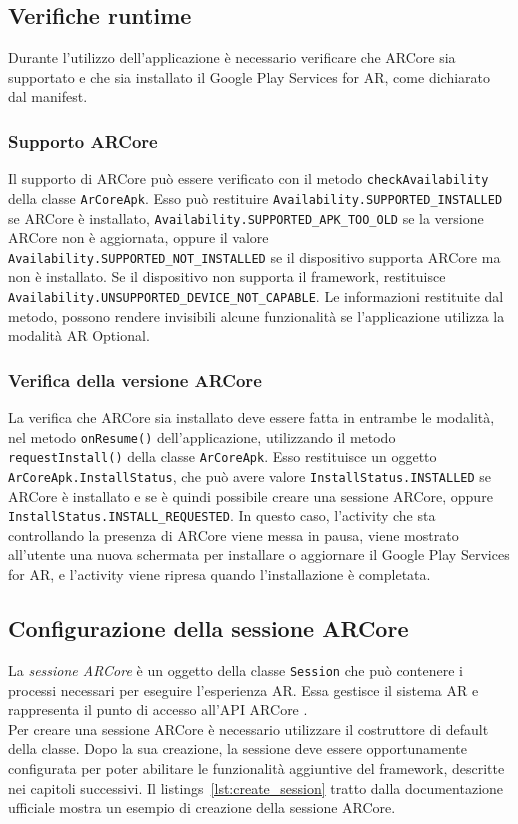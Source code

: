 \documentclass[crop=false, class=book]{standalone}
\begin{document}
	\subsection{Verifiche runtime}
	Durante l'utilizzo dell'applicazione è necessario verificare che ARCore sia supportato e che sia installato il Google Play Services for AR, come dichiarato dal manifest.
	
	\subsubsection{Supporto ARCore}
	Il supporto di ARCore può essere verificato con il metodo \verb|checkAvailability| della classe \verb|ArCoreApk|. Esso può restituire \verb|Availability.SUPPORTED_INSTALLED| se ARCore è installato, \verb|Availability.SUPPORTED_APK_TOO_OLD| se la versione ARCore non è aggiornata, oppure il valore \verb|Availability.SUPPORTED_NOT_INSTALLED| se il dispositivo supporta ARCore ma non è installato. Se il dispositivo non supporta il framework, restituisce \verb|Availability.UNSUPPORTED_DEVICE_NOT_CAPABLE|. Le informazioni restituite dal metodo, possono rendere invisibili alcune funzionalità se l'applicazione utilizza la modalità AR Optional.
	
	\subsubsection{Verifica della versione ARCore}
	La verifica che ARCore sia installato deve essere fatta in entrambe le modalità, nel metodo \verb|onResume()| dell'applicazione, utilizzando il metodo \verb|requestInstall()| della classe \verb|ArCoreApk|. Esso restituisce un oggetto \verb|ArCoreApk.InstallStatus|, che può avere valore \verb|InstallStatus.INSTALLED| se ARCore è installato e se è quindi possibile creare una sessione ARCore, oppure \verb|InstallStatus.INSTALL_REQUESTED|. In questo caso, l'activity che sta controllando la presenza di ARCore viene messa in pausa, viene mostrato all'utente una nuova schermata per installare o aggiornare il Google Play Services for AR, e l'activity viene ripresa quando l'installazione è completata.
	
	\subsection{Configurazione della sessione ARCore}
	La \textit{sessione ARCore} è un oggetto della classe \verb|Session| che può contenere i processi necessari per eseguire l'esperienza AR. Essa gestisce il sistema AR e rappresenta il punto di accesso all'API ARCore \cite{google2022session}.
	\\
	Per creare una sessione ARCore è necessario utilizzare il costruttore di default della classe. Dopo la sua creazione, la sessione deve essere opportunamente configurata per poter abilitare le funzionalità aggiuntive del framework, descritte nei capitoli successivi. Il listings~\vref{lst:create_session} tratto dalla documentazione ufficiale mostra un esempio di creazione della sessione ARCore.
	
\end{document}
